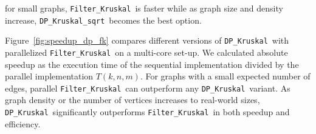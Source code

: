 \documentclass[runningheads,UKenglish]{llncs}
\newcommand{\DPmst}{\texttt{DP\_{Kruskal}}}
\newcommand{\DPmstv}[1]{\texttt{DP\_{Kruskal\_{#1}}}}
\newcommand{\FKruskal}{\texttt{Filter\_{Kruskal}}}
\begin{document}
for small graphs, \FKruskal\ is 
faster while as graph size and density increase, \DPmstv{sqrt}\ becomes the best option. %

%

%
\noindent
Figure~\ref{fig:speedup_dp_fk} compares different versions of \DPmst\ with parallelized \FKruskal\
on a multi-core set-up. We calculated absolute speedup as the execution time of the sequential 
implementation divided by the parallel implementation $T(k,n,m)$. For graphs with a small expected number
of edges, parallel \FKruskal\ can outperform any \DPmst\ variant. 
As graph density or the 
number of vertices increases to real-world sizes, \DPmst\ significantly outperforms \FKruskal\ in 
both speedup and efficiency. 
%

\end{document}
